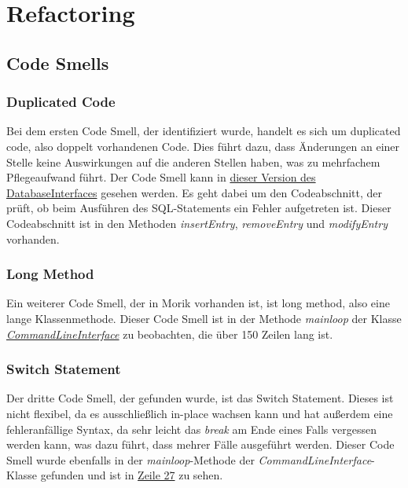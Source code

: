 \chapter{Refactoring}
\section{Code Smells}
\subsection{Duplicated Code}
Bei dem ersten Code Smell, der identifiziert wurde, handelt es sich um duplicated code, also doppelt vorhandenen Code. Dies führt dazu, dass Änderungen an einer Stelle keine Auswirkungen auf die anderen Stellen haben, was zu mehrfachem Pflegeaufwand führt. Der Code Smell kann in \href{https://github.com/moorts/Morik/blob/8c90c65347f25b5a5a26f68c66189984dfb0bca6/src/adapters/database/DatabaseInterface.cpp}{dieser Version des DatabaseInterfaces} gesehen werden. Es geht dabei um den Codeabschnitt, der prüft, ob beim Ausführen des SQL-Statements ein Fehler aufgetreten ist. Dieser Codeabschnitt ist in den Methoden \textit{insertEntry}, \textit{removeEntry} und \textit{modifyEntry} vorhanden.

\subsection{Long Method}
Ein weiterer Code Smell, der in Morik vorhanden ist, ist long method, also eine lange Klassenmethode. Dieser Code Smell ist in der Methode \textit{mainloop} der Klasse \href{https://github.com/moorts/Morik/blob/main/src/plugins/ui/CommandLineInterface.cpp}{\textit{CommandLineInterface}} zu beobachten, die über 150 Zeilen lang ist.

\subsection{Switch Statement}
Der dritte Code Smell, der gefunden wurde, ist das Switch Statement. Dieses ist nicht flexibel, da es ausschließlich in-place wachsen kann und hat außerdem eine fehleranfällige Syntax, da sehr leicht das \textit{break} am Ende eines Falls vergessen werden kann, was dazu führt, dass mehrer Fälle ausgeführt werden. Dieser Code Smell wurde ebenfalls in der \textit{mainloop}-Methode der \textit{CommandLineInterface}-Klasse gefunden und ist in \href{https://github.com/moorts/Morik/blob/5fad45957d77585d88bf3330cab6004315e6e2e3/src/plugins/ui/CommandLineInterface.cpp#L27}{Zeile 27} zu sehen.

